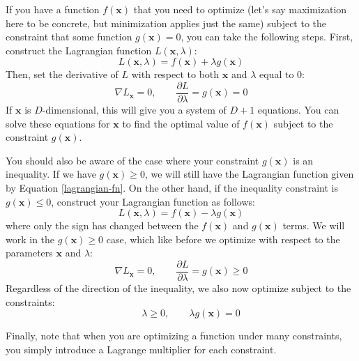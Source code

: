 If you have a function $f(\textbf{x})$ that you need to optimize (let's say maximization here to be concrete, but minimization applies just the same) subject to the constraint that some function $g(\textbf{x}) = 0$, you can take the following steps. First, construct the Lagrangian function $L(\textbf{x}, \lambda)$:
\begin{equation} \label{lagrangian-fn}
	L(\textbf{x}, \lambda) = f(\textbf{x}) + \lambda g(\textbf{x})
\end{equation}
Then, set the derivative of $L$ with respect to both $\textbf{x}$ and $\lambda$ equal to 0:
\begin{equation*}
	\nabla L_{\textbf{x}} = 0, \qquad \frac{\partial L}{\partial \lambda} = g(\textbf{x}) = 0
\end{equation*}
If $\textbf{x}$ is $D$-dimensional, this will give you a system of $D+1$ equations. You can solve these equations for $\textbf{x}$ to find the optimal value of $f(\textbf{x})$ subject to the constraint $g(\textbf{x})$.

You should also be aware of the case where your constraint $g(\textbf{x})$ is an inequality. If we have $g(\textbf{x}) \geq 0$, we will still have the Lagrangian function given by Equation \ref{lagrangian-fn}. On the other hand, if the inequality constraint is $g(\textbf{x}) \leq 0$, construct your Lagrangian function as follows:
\begin{equation*}
	L(\textbf{x}, \lambda) = f(\textbf{x}) - \lambda g(\textbf{x})
\end{equation*}
where only the sign has changed between the $f(\textbf{x})$ and $g(\textbf{x})$ terms. We will work in the $g(\textbf{x}) \geq 0$ case, which like before we optimize with respect to the parameters $\textbf{x}$ and $\lambda$:
\begin{equation*}
	\nabla L_{\textbf{x}} = 0, \qquad \frac{\partial L}{\partial \lambda} = g(\textbf{x}) \geq 0
\end{equation*}
Regardless of the direction of the inequality, we also now optimize subject to the constraints:
\begin{equation*}
	\qquad \lambda \geq 0, \qquad \lambda g(\textbf{x}) = 0
\end{equation*}


Finally, note that when you are optimizing a function under many constraints, you simply introduce a Lagrange multiplier for each constraint.

